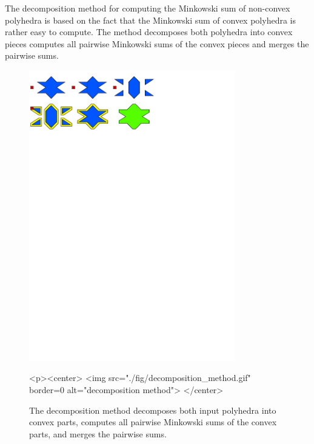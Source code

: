 The decomposition method for computing the Minkowski sum of non-convex
polyhedra is based on the fact that the Minkowski sum of convex
polyhedra is rather easy to compute. The method decomposes both
polyhedra into convex pieces computes all pairwise Minkowski sums of
the convex pieces and merges the pairwise sums.

\begin{figure}
  \begin{ccTexOnly}
    \begin{center}
      \includegraphics[width=0.8\textwidth]{Minkowski_sum_3/fig/decomposition_method}
    \end{center}
  \end{ccTexOnly}
  \begin{ccHtmlOnly}
    <p><center>
    <img src="./fig/decomposition_method.gif" border=0 alt="decomposition method">
    </center>
  \end{ccHtmlOnly}
  \caption{The decomposition method decomposes both input polyhedra
           into convex parts, computes all pairwise Minkowski sums
           of the convex parts, and merges the pairwise sums.}
\end{figure}

